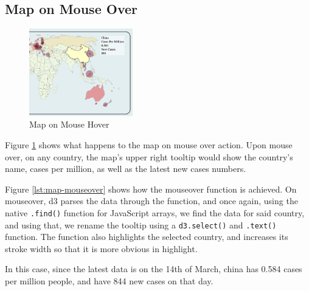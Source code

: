 \documentclass{scrreprt}
\begin{document}
\subsection{Map on Mouse Over}
\begin{figure}[H]
    \centering
    \includegraphics[width=0.4\textwidth]{images/hover-map.png}
    \caption{Map on Mouse Hover}
    \label{fig:map-hover}
\end{figure}
Figure \ref{fig:map-hover} shows what happens to the map on mouse over action. Upon mouse over, on any country, the map's upper right tooltip would show the country's name, cases per million, as well as the latest new cases numbers. 
\vspace{8pt}

Figure \ref{lst:map-mouseover} shows how the mouseover function is achieved. On mouseover, d3 parses the data through the function, and once again, using the native \verb|.find()| function for JavaScript arrays, we find the data for said country, and using that, we rename the tooltip using a \verb|d3.select()| and \verb|.text()| function. The function also highlights the selected country, and increases its stroke width so that it is more obvious in highlight. 

In this case, since the latest data is on the 14th of March, china has 0.584 cases per million people, and have 844 new cases on that day.
\end{document}
